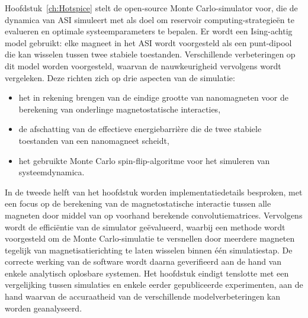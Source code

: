 Hoofdstuk~\ref{ch:Hotspice} stelt de open-source \hotspice Monte Carlo-simulator voor, die de dynamica van ASI simuleert met als doel om reservoir computing-strategie\"en te evalueren en optimale systeemparameters te bepalen.
Er wordt een Ising-achtig model gebruikt: elke magneet in het ASI wordt voorgesteld als een punt-dipool die kan wisselen tussen twee stabiele toestanden.
Verschillende verbeteringen op dit model worden voorgesteld, waarvan de nauwkeurigheid vervolgens wordt vergeleken. %
Deze richten zich op drie aspecten van de simulatie:
\begin{itemize}[noitemsep,nolistsep] %
	\item het in rekening brengen van de eindige grootte van nanomagneten voor de berekening van onderlinge magnetostatische interacties,
	\item de afschatting van de effectieve energiebarri\`ere die de twee stabiele toestanden van een nanomagneet scheidt,
	\item het gebruikte Monte Carlo spin-flip-algoritme voor het simuleren van systeemdynamica.
\end{itemize}
In de tweede helft van het hoofdstuk worden implementatiedetails besproken, met een focus op de berekening van de magnetostatische interactie tussen alle magneten door middel van op voorhand berekende convolutiematrices.
Vervolgens wordt de effici\"entie van de simulator ge\"evalueerd, waarbij een methode wordt voorgesteld om de Monte Carlo-simulatie te versnellen door meerdere magneten tegelijk van magnetisatierichting te laten wisselen binnen \'e\'en simulatiestap.
De correcte werking van de software wordt daarna geverifieerd aan de hand van enkele analytisch oplosbare systemen.
Het hoofdstuk eindigt tenslotte met een vergelijking tussen simulaties en enkele eerder gepubliceerde experimenten, aan de hand waarvan de accuraatheid van de verschillende modelverbeteringen kan worden geanalyseerd. \\

